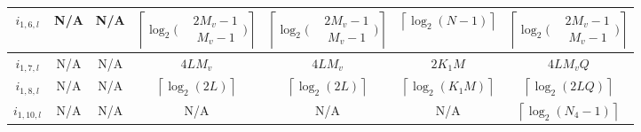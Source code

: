 \documentclass[lettersize,journal]{IEEEtran}
\begin{document}
\begin{table}[t]
{\begin{tabular}{|c|c|c|c|c|c|c|}
$i_{1,6,l}$ &  N/A &  N/A & $\left\lceil {{{\log }_2}\Big( {\begin{aligned}
&2M_v-1\\
&\;M_v-1
\end{aligned}} \Big)} \right\rceil$ & $\left\lceil {{{\log }_2}\Big( {\begin{aligned}
&2M_v-1\\
&\;M_v-1
\end{aligned}} \Big)} \right\rceil$ &$\left\lceil\log_2(N-1)\right\rceil$  & $\left\lceil {{{\log }_2}\Big( {\begin{aligned}
&2M_v-1\\
&\;M_v-1
\end{aligned}} \Big)} \right\rceil$ \\ \hline
$i_{1,7,l}$ &  N/A & N/A &  $4LM_v$ & $4LM_v$ & $2K_1M$ & $4LM_vQ$ \\ \hline
$i_{1,8,l}$ &  N/A &  N/A &  $\left\lceil {{{\log }_2}\left( {2L} \right)} \right\rceil $ & $\left\lceil {{{\log }_2}\left( {2L} \right)} \right\rceil $ & $\left\lceil\log_2(K_1M)\right\rceil$ & $\left\lceil {{{\log }_2}\left( {2LQ} \right)} \right\rceil $ \\ \hline
$i_{1,10,l}$ &  N/A &  N/A & N/A &  N/A & N/A & $\left\lceil\log_2(N_4-1)\right\rceil$ \\ \hline
\end{tabular}}
\end{table}
\end{document}
